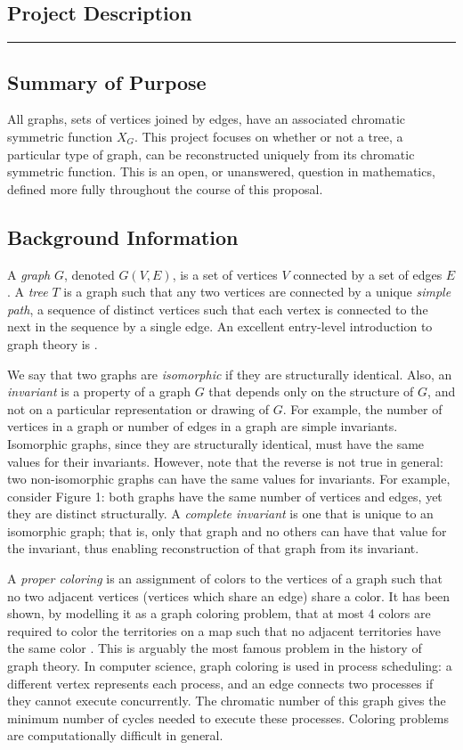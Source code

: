 \documentclass[a4paper,12pt]{article}
\begin{document}
\begin{spacing}{1}

\section*{\Large Project Description}
\hrule
\vspace{0.4cm}
\subsection*{Summary of Purpose}
All graphs, sets of vertices joined by edges, have an associated chromatic symmetric function $X_G$. This project focuses on whether or not a tree, a particular type of graph, can be reconstructed uniquely from its chromatic symmetric function. This is an open, or unanswered, question in mathematics, defined more fully throughout the course of this proposal.

\subsection*{Background Information}
A \emph{graph} $G$, denoted $G(V, E)$, is a set of vertices $V$ connected by a set of edges $E$. A \emph{tree} $T$ is a graph such that any two vertices are connected by a unique \emph{simple path}, a sequence of distinct vertices such that each vertex is connected to the next in the sequence by a single edge. An excellent entry-level introduction to graph theory is \cite{walkthroughcombinatorics}.

We say that two graphs are \emph{isomorphic} if they are structurally identical.  Also, an \emph{invariant} is a property of a graph $G$ that depends only on the structure of $G$, and not on a particular representation or drawing of $G$. For example, the number of vertices in a graph or number of edges in a graph are simple invariants. Isomorphic graphs, since they are structurally identical, must have the same values for their invariants. However, note that the reverse is not true in general: two non-isomorphic graphs can have the same values for invariants. For example, consider Figure 1: both graphs have the same number of vertices and edges, yet they are distinct structurally. A \emph{complete invariant} is one that is unique to an isomorphic graph; that is, only that graph and no others can have that value for the invariant, thus enabling reconstruction of that graph from its invariant.

A \emph{proper coloring} is an assignment of colors to the vertices of a graph such that no two adjacent vertices (vertices which share an edge) share a color. It has been shown, by modelling it as a graph coloring problem, that at most 4 colors are required to color the territories on a map such that no adjacent territories have the same color \cite{fourcolor1, fourcolor2}. This is arguably the most famous problem in the history of graph theory. In computer science, graph coloring is used in process scheduling: a different vertex represents each process, and an edge connects two processes if they cannot execute concurrently. The chromatic number of this graph gives the minimum number of cycles needed to execute these processes. Coloring problems are computationally difficult in general.


\end{spacing}
\end{document}
